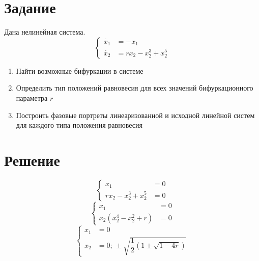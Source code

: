 


    
    \setcounter{page}{2}
    \setlength{\parindent}{0pt}

    \section*{Задание}
    Дана нелинейная система.
    \begin{equation*}
        \left\{
        \begin{aligned}
            \dot{x_1} &= -x_1\\
            \dot{x_2} &= rx_2 - x_2^3 + x_2^5
        \end{aligned}
        \right.
    \end{equation*}

    \begin{enumerate}
        \item Найти возможные бифуркации в системе
        \item Определить тип положений равновесия для всех значений бифуркационного параметра $r$
        \item Построить фазовые портреты линеаризованной и исходной линейной систем для каждого типа положения равновесия
    \end{enumerate}

    \section*{Решение}
    \begin{equation*}
        \left\{
        \begin{aligned}
            x_1 &= 0\\
            rx_2 - x_2^3 + x_2^5 &= 0
        \end{aligned}
        \right.
    \end{equation*}
    \begin{equation*}
        \left\{
        \begin{aligned}
            x_1 &= 0\\
            x_2\left( x_2^4 - x_2^2 + r \right) &= 0
        \end{aligned}
        \right.
    \end{equation*}
    \begin{equation*}
        \left\{
        \begin{aligned}
            x_1 &= 0\\
            x_2 &= 0;\, \pm \sqrt{\dfrac{1}{2}\left( 1 \pm \sqrt{1 - 4r} \right)}
        \end{aligned}
        \right.
    \end{equation*}


